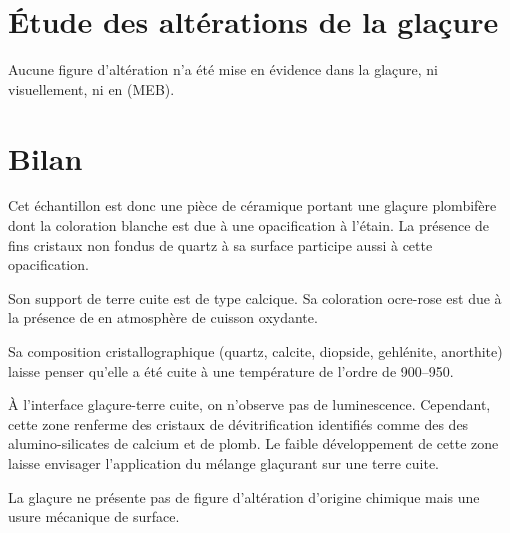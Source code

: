 \section{Étude des altérations de la glaçure}

Aucune figure d'altération n'a été mise en évidence dans la glaçure, 
ni visuellement, ni en \MEB[ie] (MEB).


\section{Bilan}

Cet échantillon est donc une pièce de céramique portant une glaçure 
plombifère dont la coloration blanche est due à une opacification à 
l'étain. La présence de fins cristaux non fondus de quartz à sa 
surface participe aussi à cette opacification.

Son support de terre cuite est de type calcique. Sa coloration 
ocre-rose est due à la présence de  en atmosphère de 
cuisson oxydante.

Sa composition cristallographique (quartz, calcite, diopside, 
gehlénite, anorthite) laisse penser qu'elle a été cuite à une 
température de l'ordre de 
\SIrange[range-phrase=\ à\ ]{900}{950}{\degC}.

À l'interface glaçure-terre cuite, on n'observe pas de luminescence. 
Cependant, cette zone renferme des cristaux de dévitrification 
identifiés comme des des alumino-silicates de calcium et de plomb. 
Le faible développement de cette zone laisse envisager l'application 
du mélange glaçurant sur une terre cuite.

La glaçure ne présente pas de figure d'altération d'origine chimique 
mais une usure mécanique de surface.